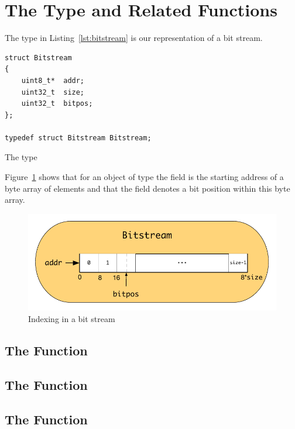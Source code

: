 \section{The Type \bitstream and Related Functions}

The type \bitstream in Listing~\ref{lst:bitstream} is our \isoc representation of a bit stream.


\begin{listing}[hbt]
\begin{center}
\begin{lstlisting}[style=acsl-block]
struct Bitstream
{
    uint8_t*  addr;
    uint32_t  size;
    uint32_t  bitpos;
};

typedef struct Bitstream Bitstream;
\end{lstlisting}
\end{center}
\caption{\label{lst:bitstream} The type \bitstream}
\end{listing}

Figure~\ref{fig:bit-stream-type}  shows that for an object of type \bitstream the field  is the
starting address of a byte array of  elements and that the field 
denotes a bit position within this byte array.

\begin{figure}[hbt]
\begin{center}
\includegraphics[scale=0.85]{Figures/bit-stream-type.pdf}
\caption{Indexing in a bit stream}
\label{fig:bit-stream-type}
\end{center}
\end{figure}

\subsection{The Function \bitstreamread}
\subsection{The Function }
\subsection{The Function }


